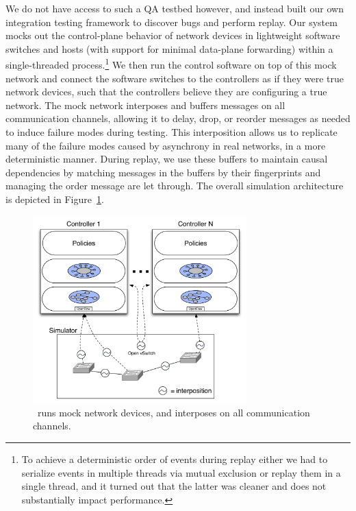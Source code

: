 We do not have access to such a QA testbed however, and instead built our own
integration testing framework to discover bugs and
perform replay. Our system mocks out the control-plane
behavior of network devices in lightweight software switches and hosts (with
support for minimal data-plane forwarding)
within a single-threaded process.\footnote{To achieve a deterministic order of
events during replay either we had to serialize events in multiple threads via
mutual exclusion or replay them in a single thread, and it turned out that
the latter was cleaner and does not substantially impact performance.} We then
run the control software on
top of this mock network and connect the software switches to the controllers as if they were true
network devices, such that the controllers believe they are configuring a true
network. The mock network interposes and buffers messages on all communication
channels, allowing it to delay, drop, or reorder
messages as needed to induce failure modes during testing. This interposition
allows us to replicate many of the failure modes caused by asynchrony in real
networks, in a more deterministic manner. During
replay, we use these buffers to maintain causal dependencies by
matching messages in the buffers by their fingerprints and managing
the order message are let through. The overall simulation architecture is depicted in
Figure~\ref{fig:architecture}.

\begin{figure}[t]
    \includegraphics[width=3.25in]{../diagrams/architecture/Debugger_Architecture.pdf}
    \caption[]{\label{fig:architecture} \projectname~runs mock
    network devices, and interposes on all communication
    channels.}
\end{figure}

